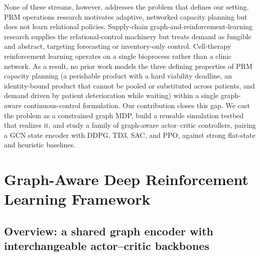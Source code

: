 \documentclass[preprint,review,12pt,nonatbib]{elsarticle}
\providecommand{\DIFadd}[1]{{\protect\color{blue}#1}} %
\providecommand{\DIFdel}[1]{} %
\providecommand{\DIFaddbegin}{} %
\providecommand{\DIFaddend}{} %
\providecommand{\DIFdelbegin}{} %
\providecommand{\DIFdelend}{} %
\providecommand{\DIFscaledelfig}{0.5}
\newlength{\DIFdelgraphicswidth} %
\newlength{\DIFdelgraphicsheight} %
\providecommand{\DIFaddincludegraphics}[2][]{{\color{blue}\fbox{\DIFOincludegraphics[#1]{#2}}}} %
\providecommand{\DIFdelincludegraphics}[2][]{%
\sbox{\DIFdelgraphicsbox}{\DIFOincludegraphics[#1]{#2}}%
\settoboxwidth{\DIFdelgraphicswidth}{\DIFdelgraphicsbox} %
\settoboxtotalheight{\DIFdelgraphicsheight}{\DIFdelgraphicsbox} %
\scalebox{\DIFscaledelfig}{%
\parbox[b]{\DIFdelgraphicswidth}{\usebox{\DIFdelgraphicsbox}\\[-\baselineskip] \rule{\DIFdelgraphicswidth}{0em}}\llap{\resizebox{\DIFdelgraphicswidth}{\DIFdelgraphicsheight}{%
\setlength{\unitlength}{\DIFdelgraphicswidth}%
\begin{picture}(1,1)%
\thicklines\linethickness{2pt} %
{\color[rgb]{1,0,0}\put(0,0){\framebox(1,1){}}}%
{\color[rgb]{1,0,0}\put(0,0){\line( 1,1){1}}}%
{\color[rgb]{1,0,0}\put(0,1){\line(1,-1){1}}}%
\end{picture}%
}\hspace*{3pt}}} %
} %
\DeclareRobustCommand{\DIFaddbegin}{\DIFOaddbegin \let\includegraphics\DIFaddincludegraphics} %
\DeclareRobustCommand{\DIFaddend}{\DIFOaddend \let\includegraphics\DIFOincludegraphics} %
\DeclareRobustCommand{\DIFdelbegin}{\DIFOdelbegin \let\includegraphics\DIFdelincludegraphics} %
\DeclareRobustCommand{\DIFdelend}{\DIFOaddend \let\includegraphics\DIFOincludegraphics} %
\begin{document}
\DIFdelbegin \DIFdel{Published PRM operations studies establish the need for distributed capacity planning under uncertainty, but they are predominantly simulation, OR, ADP, or flat-state DRL based. Recent supply chain RL studies show that simulation-trained policiescan handle stochastic inventory and capacity-control problems, but they usually flatten network state or focus on replenishment rather than jointly modeling capacity relocation, consumables, and specimen transshipment. Recent GNN studies show that supply chains are natively graph structured, yet much of this work remains predictive or inventory-focused. This study addresses the gap by developing a GCN-DDPG framework that learns a }\DIFdelend \DIFaddbegin \DIFadd{None of these streams, however, addresses the problem that defines our setting. PRM operations research motivates adaptive, networked capacity planning but does not learn relational policies. Supply-chain graph-and-reinforcement-learning research supplies the relational-control machinery but treats demand as fungible and abstract, targeting forecasting or inventory-only control. Cell-therapy reinforcement learning operates on a single bioprocess rather than a clinic network. As a result, no prior work models the three defining properties of PRM capacity planning (a perishable product with a hard viability deadline, an identity-bound product that cannot be pooled or substituted across patients, and demand driven by patient deterioration while waiting) within a single }\DIFaddend graph-aware \DIFdelbegin \DIFdel{continuous-action policy for distributed PRM manufacturing under supplier disruption and demand forecast error. The framework is positioned as an intelligent engineering decision-support system rather than only a domain-specific application of DDPG}\DIFdelend \DIFaddbegin \DIFadd{continuous-control formulation. Our contribution closes this gap. We cast the problem as a constrained graph MDP, build a reusable simulation testbed that realizes it, and study a family of graph-aware actor--critic controllers, pairing a GCN state encoder with DDPG, TD3, SAC, and PPO, against strong flat-state and heuristic baselines}\DIFaddend .

\section{Graph-Aware Deep Reinforcement Learning Framework}
\label{sec:method}
\DIFdelbegin \textbf{\DIFdel{Integrating DDPG with GCN for Distributed Manufacturing (DDPG-GCN):}}
\DIFdelend \DIFaddbegin \subsection*{\DIFadd{Overview: a shared graph encoder with interchangeable actor--critic backbones}}
\DIFaddend 
\end{document}
